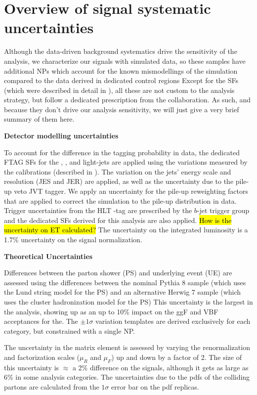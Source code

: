 \section{Overview of signal systematic uncertainties}

Although the data-driven background systematics drive the sensitivity of the analysis, we characterize our signals with simulated data, so these samples have additional NPs which account for the known mismodellings of the simulation compared to the data derived in dedicated control regions
Except for the \et SFs (which were described in detail in \Sect{\ref{subsec:trig-sf-et}}), all these are not custom to the analysis strategy, but follow a dedicated prescription from the collaboration. As such, and because they don't drive our analysis sensitivity, we will just give a very brief summary of them here.

\noindent
\textbf{Detector modelling uncertainties}

To account for the difference in the tagging probability in data, the dedicated FTAG SFs for the \Pqb, \Pqc, and light-jets are applied using the variations measured by the calibrations (described in \Sect{\ref{d1r-calibration}}).
The variation on the jets' energy scale and resolution (JES and JER) are applied, as well as the uncertainty due to the pile-up veto JVT tagger.
We apply an uncertainty for the pile-up reweighting factors that are applied to correct the simulation to the pile-up distribution in data.
Trigger uncertainties from the HLT \Pqb-tag are prescribed by the $b$-jet trigger group and the dedicated \et SFs derived for this analysis are also applied. \hl{How is the uncertainty on ET calculated?}
The uncertainty on the integrated luminosity is a 1.7\% uncertainty on the signal normalization.%

\noindent
\textbf{Theoretical Uncertainties}

Differences between the parton shower (PS) and underlying event (UE) are assessed using the differences between the nominal Pythia 8 sample (which uses the Lund string model for the PS) and an alternative Herwig 7 sample (which uses the cluster hadronization model for the PS)
This uncertainty is the largest in the analysis, showing up as an up to 10\% impact on the ggF and VBF acceptances for the.
The $\pm 1 \sigma$ variation templates are derived exclusively for each category, but constrained with a single NP. 

The uncertainty in the matrix element is assessed by varying the renormalization and factorization scales ($\mu_R$ and $\mu_F$) up and down by a factor of 2.
The size of this uncertainty is $\approx$ a 2\% difference on the signals, although it gets as large as 6\% in some analysis categories.
The uncertainties due to the pdfs of the colliding partons are calculated from the $1\sigma$ error bar on the pdf replicas.

